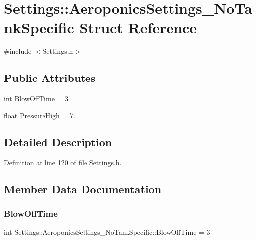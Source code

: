 \hypertarget{struct_settings_1_1_aeroponics_settings___no_tank_specific}{}\section{Settings\+:\+:Aeroponics\+Settings\+\_\+\+No\+Tank\+Specific Struct Reference}
\label{struct_settings_1_1_aeroponics_settings___no_tank_specific}


{\ttfamily \#include $<$Settings.\+h$>$}

\subsection*{Public Attributes}
\begin{DoxyCompactItemize}
\item 
int \hyperlink{struct_settings_1_1_aeroponics_settings___no_tank_specific_a2ec1420bffbe66552df8c4f5a3d13433}{Blow\+Off\+Time} = 3
\item 
float \hyperlink{struct_settings_1_1_aeroponics_settings___no_tank_specific_a11447439cc0d58c6c356b62d5469969c}{Pressure\+High} = 7.
\end{DoxyCompactItemize}


\subsection{Detailed Description}


Definition at line 120 of file Settings.\+h.



\subsection{Member Data Documentation}
\mbox{\label{struct_settings_1_1_aeroponics_settings___no_tank_specific_a2ec1420bffbe66552df8c4f5a3d13433}} 
\subsubsection{\texorpdfstring{Blow\+Off\+Time}{BlowOffTime}}
{\footnotesize\ttfamily int Settings\+::\+Aeroponics\+Settings\+\_\+\+No\+Tank\+Specific\+::\+Blow\+Off\+Time = 3}



